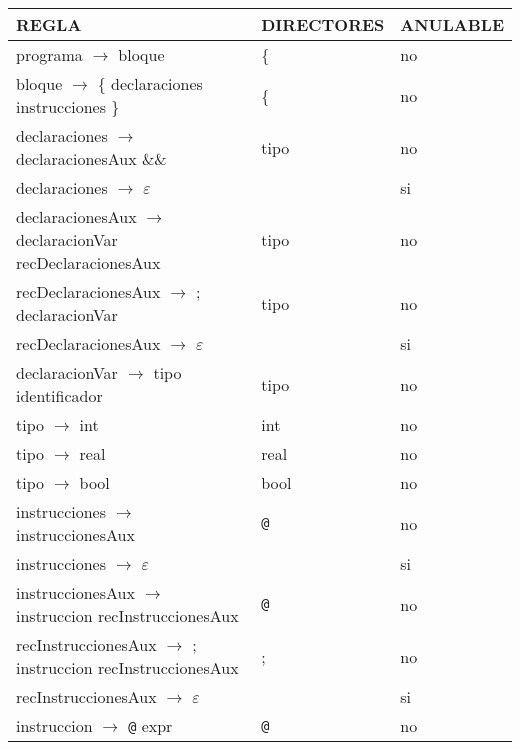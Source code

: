 \documentclass[11pt]{article}
\begin{document}
            \begin{longtable}{|p{6cm}|p{4cm}|p{3cm}|}
                \hline
                \textbf{REGLA} & \textbf{DIRECTORES} & \textbf{ANULABLE} \\
                \hline
                programa $\rightarrow$ bloque & \{ & no \\
                \hline
                bloque $\rightarrow$ \{ declaraciones instrucciones \} & \{ & no \\
                \hline
                declaraciones $\rightarrow$ declaracionesAux \&\& & tipo & no \\
                \hline
                declaraciones $\rightarrow$ $\varepsilon$ & & si \\
                \hline
                declaracionesAux $\rightarrow$ declaracionVar recDeclaracionesAux & tipo & no \\
                \hline
                recDeclaracionesAux $\rightarrow$ ; declaracionVar & tipo & no \\
                \hline
                recDeclaracionesAux $\rightarrow$ $\varepsilon$ &  & si \\
                \hline
                declaracionVar  $\rightarrow$ tipo identificador & tipo & no \\
                \hline
                tipo $\rightarrow$ int & int & no \\
                \hline
                tipo $\rightarrow$ real & real & no \\
                \hline
                tipo $\rightarrow$ bool & bool & no \\
                \hline
                instrucciones $\rightarrow$ instruccionesAux & \verb|@| & no \\
                \hline
                instrucciones $\rightarrow$ $\varepsilon$ & & si \\
                \hline
                instruccionesAux $\rightarrow$ instruccion recInstruccionesAux & \verb|@| & no \\
                \hline
                recInstruccionesAux $\rightarrow$ ; instruccion recInstruccionesAux & ; & no \\
                \hline
                recInstruccionesAux $\rightarrow$ $\varepsilon$ &  & si \\
                \hline
                instruccion $\rightarrow$ \verb|@| expr & \verb|@| & no \\
                \hline

\end{longtable}
\end{document}
